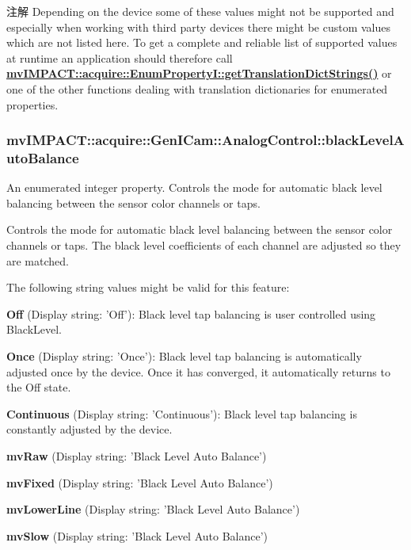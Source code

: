 \begin{DoxyNote}{注解}
Depending on the device some of these values might not be supported and especially when working with third party devices there might be custom values which are not listed here. To get a complete and reliable list of supported values at runtime an application should therefore call {\bfseries \hyperlink{classmv_i_m_p_a_c_t_1_1acquire_1_1_enum_property_i_a0ba6ccbf5ee69784d5d0b537924d26b6}{mv\+I\+M\+P\+A\+C\+T\+::acquire\+::\+Enum\+Property\+I\+::get\+Translation\+Dict\+Strings()}} or one of the other functions dealing with translation dictionaries for enumerated properties. 
\end{DoxyNote}
\hypertarget{classmv_i_m_p_a_c_t_1_1acquire_1_1_gen_i_cam_1_1_analog_control_ab166c6492d2dcefd5bdb1df261743bdf}{
\subsubsection[{black\+Level\+Auto\+Balance}]{ mv\+I\+M\+P\+A\+C\+T\+::acquire\+::\+Gen\+I\+Cam\+::\+Analog\+Control\+::black\+Level\+Auto\+Balance}}\label{classmv_i_m_p_a_c_t_1_1acquire_1_1_gen_i_cam_1_1_analog_control_ab166c6492d2dcefd5bdb1df261743bdf}


An enumerated integer property. Controls the mode for automatic black level balancing between the sensor color channels or taps. 

Controls the mode for automatic black level balancing between the sensor color channels or taps. The black level coefficients of each channel are adjusted so they are matched.

The following string values might be valid for this feature\+:
\begin{DoxyItemize}
\item {\bfseries Off} (Display string\+: 'Off')\+: Black level tap balancing is user controlled using Black\+Level.
\item {\bfseries Once} (Display string\+: 'Once')\+: Black level tap balancing is automatically adjusted once by the device. Once it has converged, it automatically returns to the Off state.
\item {\bfseries Continuous} (Display string\+: 'Continuous')\+: Black level tap balancing is constantly adjusted by the device.
\item {\bfseries mv\+Raw} (Display string\+: 'Black Level Auto Balance')
\item {\bfseries mv\+Fixed} (Display string\+: 'Black Level Auto Balance')
\item {\bfseries mv\+Lower\+Line} (Display string\+: 'Black Level Auto Balance')
\item {\bfseries mv\+Slow} (Display string\+: 'Black Level Auto Balance')
\end{DoxyItemize}

